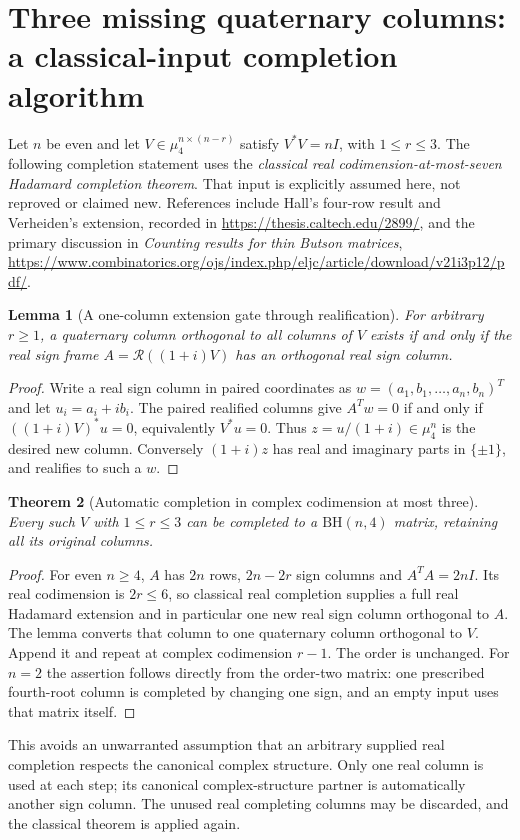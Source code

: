 \documentclass[11pt]{article}
\newtheorem{theorem}{Theorem}[section]
\newtheorem{lemma}[theorem]{Lemma}
\begin{document}
\section{Three missing quaternary columns: a classical-input completion algorithm}
Let $n$ be even and let $V\in\mu_4^{n\times(n-r)}$ satisfy
$V^*V=nI$, with $1\le r\le3$. The following completion statement
uses the \emph{classical real codimension-at-most-seven Hadamard
completion theorem}. That input is explicitly assumed here, not
reproved or claimed new. References include Hall's four-row result
and Verheiden's extension, recorded in
\url{https://thesis.caltech.edu/2899/}, and the primary discussion in
\emph{Counting results for thin Butson matrices},
\url{https://www.combinatorics.org/ojs/index.php/eljc/article/download/v21i3p12/pdf/}.

\begin{lemma}[A one-column extension gate through realification]
For arbitrary $r\ge1$, a quaternary column orthogonal to all columns
of $V$ exists if and only if the real sign frame
$A=\mathcal R((1+i)V)$ has an orthogonal real sign column.
\end{lemma}
\begin{proof}
Write a real sign column in paired coordinates as
$w=(a_1,b_1,\ldots,a_n,b_n)^T$ and let $u_i=a_i+ib_i$.
The paired realified columns give
$A^Tw=0$ if and only if $((1+i)V)^*u=0$, equivalently $V^*u=0$.
Thus $z=u/(1+i)\in\mu_4^n$ is the desired new column.
Conversely $(1+i)z$ has real and imaginary parts in $\{\pm1\}$,
and realifies to such a $w$.
\end{proof}

\begin{theorem}[Automatic completion in complex codimension at most three]
Every such $V$ with $1\le r\le3$ can be completed to a
$\mathrm{BH}(n,4)$ matrix, retaining all its original columns.
\end{theorem}
\begin{proof}
For even $n\ge4$, $A$ has $2n$ rows, $2n-2r$ sign columns and
$A^TA=2nI$. Its real codimension is $2r\le6$, so classical real
completion supplies a full real Hadamard extension and in particular
one new real sign column orthogonal to $A$. The lemma converts that
column to one quaternary column orthogonal to $V$. Append it and
repeat at complex codimension $r-1$. The order is unchanged.
For $n=2$ the assertion follows directly from the order-two matrix:
one prescribed fourth-root column is completed by changing one sign,
and an empty input uses that matrix itself.
\end{proof}
This avoids an unwarranted assumption that an arbitrary supplied real
completion respects the canonical complex structure. Only one real
column is used at each step; its canonical complex-structure partner
is automatically another sign column. The unused real completing
columns may be discarded, and the classical theorem is applied again.
\end{document}
